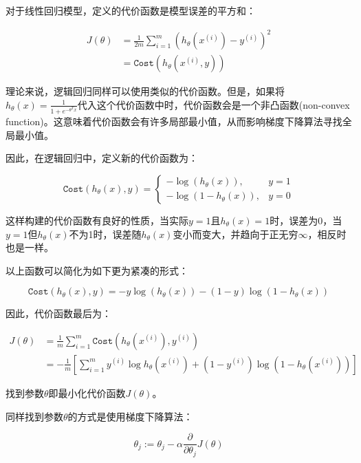 \documentclass[12pt, a4paper]{article}
\begin{document}
对于线性回归模型，定义的代价函数是模型误差的平方和：

\begin{align*}
    J(\theta) & = \frac{1}{2m}\sum_{i=1}^{m}(h_\theta(x^{(i)})-y^{(i)})^2 \\
              & = \mathtt{Cost}(h_\theta(x^{(i)}, y))
\end{align*}

理论来说，逻辑回归同样可以使用类似的代价函数。但是，如果将$h_\theta(x)=\frac{1}{1+e^{-\theta^Tx}}$代入这个代价函数中时，代价函数会是一个非凸函数(non-convex function)。这意味着代价函数会有许多局部最小值，从而影响梯度下降算法寻找全局最小值。

因此，在逻辑回归中，定义新的代价函数为：

\begin{equation*}
    \mathtt{Cost}(h_\theta(x), y) = 
    \begin{cases}
        -\log(h_\theta(x)),   & y = 1 \\
        -\log(1-h_\theta(x)), & y = 0
    \end{cases}
\end{equation*}

这样构建的代价函数有良好的性质，当实际$y=1$且$h_\theta(x)=1$时，误差为0，当$y=1$但$h_\theta(x)$不为1时，误差随$h_\theta(x)$变小而变大，并趋向于正无穷$\infty$，相反时也是一样。

以上函数可以简化为如下更为紧凑的形式：

\begin{equation*}
    \mathtt{Cost}(h_{\theta}(x), y) = -y\log(h_\theta(x)) - (1-y)\log(1-h_\theta(x))
\end{equation*}

因此，代价函数最后为：

\begin{align*}
    J(\theta) & = \frac{1}{m}\sum^{m}_{i=1}\mathtt{Cost}(h_\theta(x^{(i)}), y^{(i)})                                 \\
              & = -\frac{1}{m}[\sum^{m}_{i=1}y^{(i)}\log h_\theta(x^{(i)}) + (1 - y^{(i)})\log(1-h_\theta(x^{(i)}))]
\end{align*}

找到参数$\theta$即最小化代价函数$J(\theta)$。

同样找到参数$\theta$的方式是使用梯度下降算法：

\begin{equation*}
    \theta_j:=\theta_j-\alpha\frac{\partial}{\partial\theta_j}J(\theta)
\end{equation*}
\end{document}
